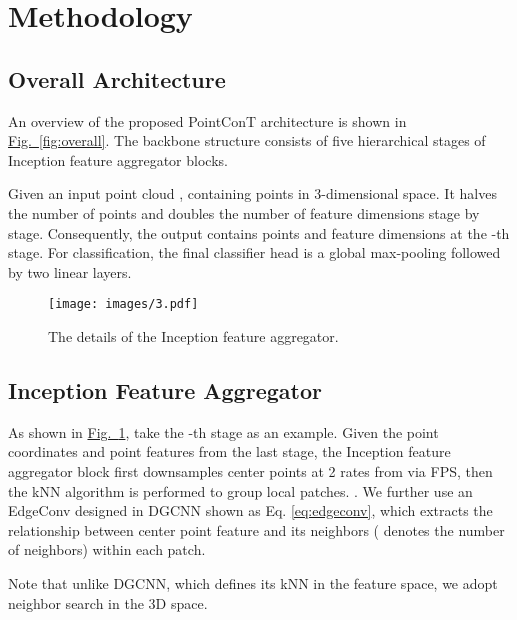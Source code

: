 \documentclass[lettersize,journal]{IEEEtran}
\begin{document}
\section{Methodology}

\subsection{Overall Architecture}

An overview of the proposed PointConT architecture is shown
in \hyperref[fig:overall]{Fig.~\ref*{fig:overall}}.
The backbone structure consists of five hierarchical stages of Inception feature aggregator blocks. 

Given an input point cloud , containing  points in 3-dimensional space.
It halves the number of points and doubles the number of feature dimensions stage by stage. 
Consequently, the output contains  points and  feature dimensions at the -th stage.
For classification, the final classifier head is a global max-pooling followed by two linear layers.


\begin{figure}
  \centering
  \texttt{[image: images/3.pdf]}
  \caption{The details of the Inception feature aggregator.}
  \label{fig:inception}
\end{figure}

\subsection{Inception Feature Aggregator}
As shown in \hyperref[fig:inception]{Fig.~\ref*{fig:inception}}, take the -th  stage as an example. Given the point coordinates  and point features  from the last stage, 
the Inception feature aggregator block first downsamples center points at 2 rates from  via FPS, then the kNN algorithm is performed 
to group local patches. . We further use an EdgeConv designed in DGCNN\cite{dgcnn} shown as Eq. \eqref{eq:edgeconv}, which extracts the relationship between center point feature  and its neighbors  
( denotes the number of neighbors) within each patch. 

Note that unlike DGCNN, which defines its kNN in the feature space, we adopt neighbor search in the 3D space.
\end{document}

